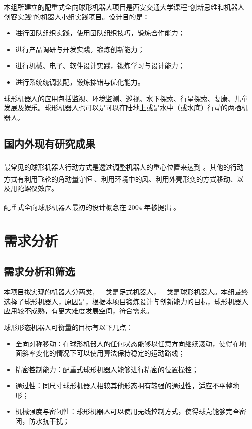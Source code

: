 \documentclass[a4paper]{ctexart}
\newcommand{ \upcite}[1]{\textsuperscript{\textsuperscript{\cite{#1} } }}
\numberwithin{equation}{section}
\numberwithin{table}{section}
\numberwithin{figure}{section}
\begin{document}
本组所建立的配重式全向球形机器人项目是西安交通大学课程“创新思维和机器人创客实践”的机器人小组实践项目。设计目的是：

\begin{itemize}
  \item 进行团队组织实践，使用团队组织技巧，锻炼合作能力；
  \item 进行产品调研与开发实践，锻炼创新能力；
  \item 进行机械、电子、软件设计实践，锻炼学习与设计能力；
  \item 进行系统统调装配，锻炼排错与优化能力。
\end{itemize}

球形机器人的应用包括监视、环境监测、巡视、水下探索、行星探索、复康、儿童发展及娱乐。球形机器人也可以是可以在陆地上或是水中（或水底）行动的两栖机器人。

\subsection{国内外现有研究成果}

最常见的球形机器人行动方式是透过调整机器人的重心位置来达到\upcite{halme1996motion}。其他的行动方式有利用飞轮的角动量守恒\upcite{joshi2010design}、利用环境中的风、利用外壳形变的方式移动、以及用陀螺仪效应。

配重式全向球形机器人最初的设计概念在 2004 年被提出\upcite{2004Introducing}。

\section{需求分析}

\subsection{需求分析和筛选}

本项目拟实现的机器人分两类，一类是足式机器人，一类是球形机器人。本组最终选择了球形机器人，原因是，根据本项目锻炼设计与创新能力的目标，球形机器人应用较不成熟，有更大难度发展空间，符合需求。

球形形态机器人可衡量的目标有以下几点：

\begin{itemize}
  \item 全向对称移动：在球形机器人的任何状态能够以任意方向继续滚动，使得在地面斜率变化的情况下可以使用算法保持稳定的运动路线；
  \item 精密控制能力：配重式球形机器人能够进行精密的位置操控；
  \item 通过性：同尺寸球形机器人相较其他形态拥有较强的通过性，适应不平整地形；
  \item 机械强度与密闭性：球形机器人可以使用无线控制方式，使得球壳能够完全密闭，防水抗干扰；
\end{itemize}
\end{document}
